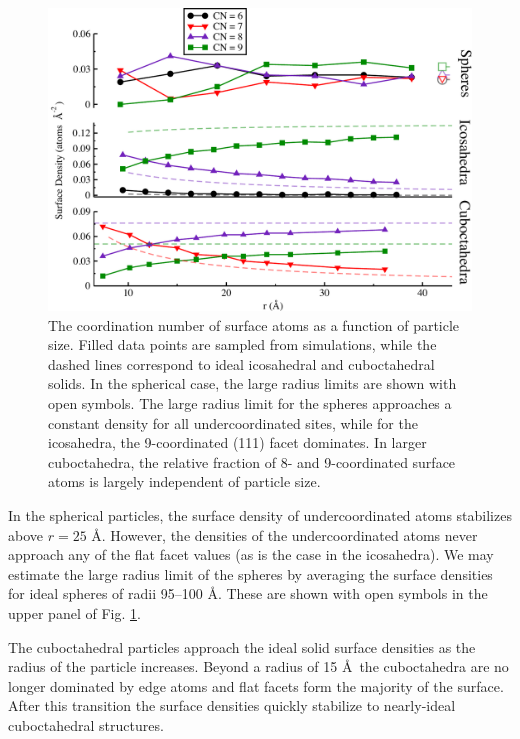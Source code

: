 \begin{figure}
	\includegraphics[width=\linewidth]{figures/new-cn.pdf}
	\caption{The coordination number of surface atoms as a
          function of particle size. Filled data points are sampled
          from simulations, while the dashed lines correspond to ideal
          icosahedral and cuboctahedral solids. In the spherical case,
          the large radius limits are shown with open symbols.  The
          large radius limit for the spheres approaches a constant
          density for all undercoordinated sites, while for the
          icosahedra, the 9-coordinated (111) facet dominates. In
          larger cuboctahedra, the relative fraction of 8- and
          9-coordinated surface atoms is largely independent of
          particle size.} 
	\label{fig:stacked-cn}
\end{figure}

In the spherical particles, the surface density of undercoordinated
atoms stabilizes above $r = 25$ \AA.  However, the densities of the
undercoordinated atoms never approach any of the flat facet values (as
is the case in the icosahedra).  We may estimate the large radius
limit of the spheres by averaging the surface densities for ideal
spheres of radii 95--100 \AA.  These are shown with open symbols in
the upper panel of Fig. \ref{fig:stacked-cn}.

The cuboctahedral particles approach the ideal solid surface densities
as the radius of the particle increases. Beyond a radius of 15 \AA\,
the cuboctahedra are no longer dominated by edge atoms and flat facets
form the majority of the surface. After this transition the surface
densities quickly stabilize to nearly-ideal cuboctahedral structures.

